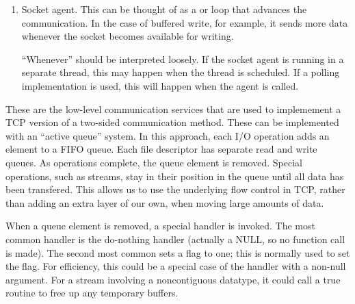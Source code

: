 \begin{enumerate}
\item Socket agent.  This can be thought of as a 
    or  loop that advances the communication.  In the case
    of buffered write, for example, it sends more data whenever the
    socket becomes available for writing.

    ``Whenever'' should be interpreted loosely.  If the socket
    agent is running in a separate thread, this may happen when the
    thread is scheduled.  If a polling implementation is used, this
    will happen when the agent is called.

\end{enumerate}
These are the low-level communication services that are used to
implemement a TCP version of a two-sided communication method.
These can be implemented with an ``active queue'' system.  In this
approach, each I/O operation adds an element to a FIFO queue.  Each
file descriptor has separate read and write queues.  As operations
complete, the queue element is removed.  Special operations, such as
streams, stay in their position in the queue until all data has been
transfered.  This allows us to use the underlying flow control in TCP,
rather than adding an extra layer of our own, when moving large
amounts of data.

When a queue element is removed, a special handler is invoked.  The
most common handler is the do-nothing handler (actually a NULL, so no
function call is made).  The second most common
sets a flag to one; this is normally used to set the
 flag.  For efficiency, this could be a
special case of the  handler with a non-null argument.
For a stream involving a noncontiguous datatype, it could call a true
routine to free up any temporary buffers.

